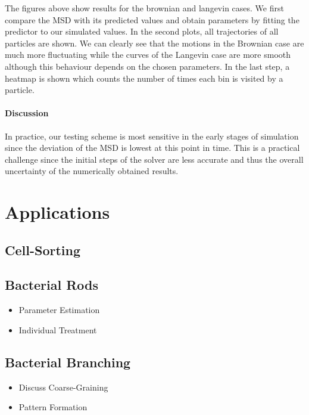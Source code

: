 \documentclass[a4paper]{article}
\begin{document}
The figures above show results for the brownian and langevin cases.
We first compare the MSD with its predicted values and obtain parameters by fitting the predictor
to our simulated values.
In the second plots, all trajectories of all particles are shown.
We can clearly see that the motions in the Brownian case are much more fluctuating while the curves
of the Langevin case are more smooth although this behaviour depends on the chosen parameters.
In the last step, a heatmap is shown which counts the number of times each bin is visited by a
particle.

\paragraph{Discussion}
In practice, our testing scheme is most sensitive in the early stages of simulation since the
deviation of the MSD is lowest at this point in time.
This is a practical challenge since the initial steps of the solver are less accurate and thus the
overall uncertainty of the numerically obtained results.

\pagebreak
\section{Applications}
\subsection{Cell-Sorting}
\subsection{Bacterial Rods}
\begin{itemize}
    \item Parameter Estimation
    \item Individual Treatment
\end{itemize}
\subsection{Bacterial Branching}
\begin{itemize}
    \item Discuss Coarse-Graining
    \item Pattern Formation
\end{itemize}

\end{document}
